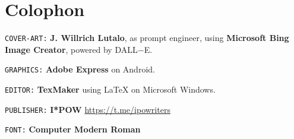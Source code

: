 \documentclass[a4paper, 18pt]{book} %
\begin{document}

\chapter*{Colophon}


\texttt{COVER-ART:} \textbf{J. Willrich Lutalo}, as prompt engineer, using \textbf{Microsoft Bing Image Creator}, powered by DALL$-$E.


\texttt{GRAPHICS:} \textbf{Adobe Express} on Android.


\texttt{EDITOR:} \textbf{TexMaker} using LaTeX on Microsoft Windows.


\texttt{PUBLISHER:} \textbf{I*POW} \url{https://t.me/ipowriters}


\texttt{FONT:} \textbf{Computer Modern Roman}


\end{document}
